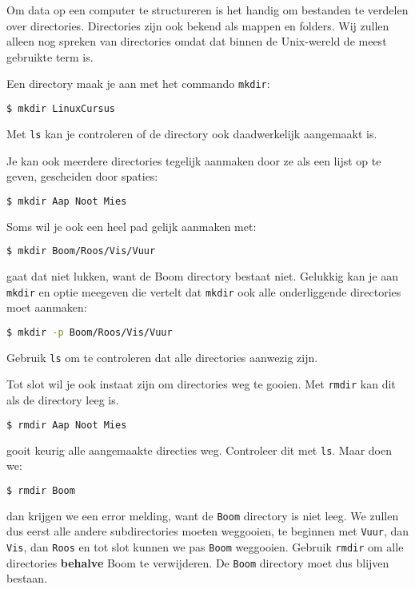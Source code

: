 Om data op een computer te structureren is het handig om bestanden te verdelen over directories. Directories zijn ook bekend als mappen en folders. Wij zullen alleen nog spreken van directories omdat dat binnen de Unix-wereld de meest gebruikte term is.

Een directory maak je aan met het commando \texttt{mkdir}:
\begin{lstlisting}[language=bash]
$ mkdir LinuxCursus
\end{lstlisting}
Met \texttt{ls} kan je controleren of de directory ook daadwerkelijk aangemaakt is.

Je kan ook meerdere directories tegelijk aanmaken door ze als een lijst op te geven, gescheiden door spaties:
\begin{lstlisting}[language=bash]
$ mkdir Aap Noot Mies
\end{lstlisting}

Soms wil je ook een heel pad gelijk aanmaken met:
\begin{lstlisting}[language=bash]
$ mkdir Boom/Roos/Vis/Vuur
\end{lstlisting}
gaat dat niet lukken, want de Boom directory bestaat niet. Gelukkig kan je aan \texttt{mkdir} en optie meegeven die vertelt dat \texttt{mkdir} ook alle onderliggende directories moet aanmaken:
\begin{lstlisting}[language=bash]
$ mkdir -p Boom/Roos/Vis/Vuur
\end{lstlisting}
Gebruik \texttt{ls} om te controleren dat alle directories aanwezig zijn.

Tot slot wil je ook instaat zijn om directories weg te gooien. Met \texttt{rmdir} kan dit als de directory leeg is.
\begin{lstlisting}[language=bash]
$ rmdir Aap Noot Mies
\end{lstlisting}
gooit keurig alle aangemaakte directies weg. Controleer dit met \texttt{ls}. Maar doen we:
\begin{lstlisting}[language=bash]
$ rmdir Boom
\end{lstlisting}
dan krijgen we een error melding, want de \texttt{Boom} directory is niet leeg. We zullen dus eerst alle andere subdirectories moeten weggooien, te beginnen met \texttt{Vuur}, dan \texttt{Vis}, dan \texttt{Roos} en tot slot kunnen we pas \texttt{Boom} weggooien. Gebruik \texttt{rmdir} om alle directories \textbf{behalve} Boom te verwijderen. De \texttt{Boom} directory moet dus blijven bestaan. 
